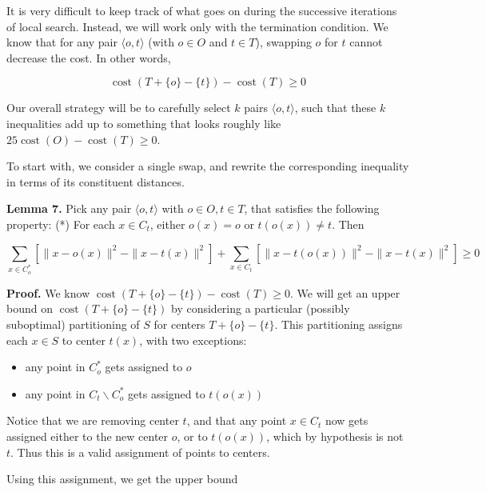 \documentclass{article}
\begin{document}
It is very difficult to keep track of what goes on during the successive iterations of local search. Instead, we will work only with the termination condition. We know that for any pair $\langle o, t\rangle$ (with $o \in O$ and $t \in T$), swapping $o$ for $t$ cannot decrease the cost. In other words,

\begin{equation*}
\operatorname{cost}(T+\{o\}-\{t\})-\operatorname{cost}(T) \geq 0
\end{equation*}

Our overall strategy will be to carefully select $k$ pairs $\langle o, t\rangle$, such that these $k$ inequalities add up to something that looks roughly like $25 \operatorname{cost}(O)-\operatorname{cost}(T) \geq 0$.

To start with, we consider a single swap, and rewrite the corresponding inequality in terms of its constituent distances.

\textbf{Lemma 7.} Pick any pair $\langle o, t\rangle$ with $o \in O, t \in T$, that satisfies the following property:
(*) For each $x \in C_{t}$, either $o(x)=o$ or $t(o(x)) \neq t$.
Then

\begin{equation*}
\sum_{x \in C_{o}^{*}}\left[\|x-o(x)\|^{2}-\|x-t(x)\|^{2}\right]+\sum_{x \in C_{t}}\left[\|x-t(o(x))\|^{2}-\|x-t(x)\|^{2}\right] \geq 0
\end{equation*}

\textbf{Proof.} We know $\operatorname{cost}(T+\{o\}-\{t\})-\operatorname{cost}(T) \geq 0$. We will get an upper bound on $\operatorname{cost}(T+\{o\}-\{t\})$ by considering a particular (possibly suboptimal) partitioning of $S$ for centers $T+\{o\}-\{t\}$. This partitioning assigns each $x \in S$ to center $t(x)$, with two exceptions:

\begin{itemize}
    \item any point in $C_{o}^{*}$ gets assigned to $o$
    \item any point in $C_{t} \backslash C_{o}^{*}$ gets assigned to $t(o(x))$
\end{itemize}

Notice that we are removing center $t$, and that any point $x \in C_{t}$ now gets assigned either to the new center $o$, or to $t(o(x))$, which by hypothesis is not $t$. Thus this is a valid assignment of points to centers.

Using this assignment, we get the upper bound
\end{document}
